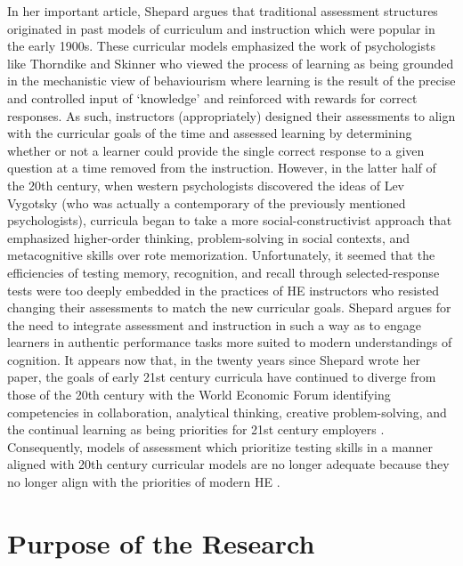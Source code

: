 \documentclass[
]{book}
\begin{document}
In her important article, Shepard \citeyearpar{shepardRoleAssessmentLearning2000} argues that traditional assessment structures originated in past models of curriculum and instruction which were popular in the early 1900s. These curricular models emphasized the work of psychologists like Thorndike and Skinner who viewed the process of learning as being grounded in the mechanistic view of behaviourism where learning is the result of the precise and controlled input of `knowledge' and reinforced with rewards for correct responses. As such, instructors (appropriately) designed their assessments to align with the curricular goals of the time and assessed learning by determining whether or not a learner could provide the single correct response to a given question at a time removed from the instruction. However, in the latter half of the 20th century, when western psychologists discovered the ideas of Lev Vygotsky (who was actually a contemporary of the previously mentioned psychologists), curricula began to take a more social-constructivist approach that emphasized higher-order thinking, problem-solving in social contexts, and metacognitive skills over rote memorization. Unfortunately, it seemed that the efficiencies of testing memory, recognition, and recall through selected-response tests were too deeply embedded in the practices of HE instructors who resisted changing their assessments to match the new curricular goals. Shepard argues for the need to integrate assessment and instruction in such a way as to engage learners in authentic performance tasks more suited to modern understandings of cognition. It appears now that, in the twenty years since Shepard wrote her paper, the goals of early 21st century curricula have continued to diverge from those of the 20th century with the World Economic Forum identifying competencies in collaboration, analytical thinking, creative problem-solving, and the continual learning as being priorities for 21st century employers \citep{worldeconomicforumFutureJobsReport2020}. Consequently, models of assessment which prioritize testing skills in a manner aligned with 20th century curricular models are no longer adequate because they no longer align with the priorities of modern HE \citep{crooksImpactClassroomEvaluation1988}.

\hypertarget{purpose-of-the-research}{%
\section{Purpose of the Research}\label{purpose-of-the-research}}
\end{document}
